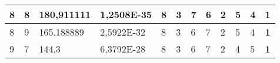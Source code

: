 \documentclass[conference]{IEEEtran}
\begin{document}
\begin{table*}[]
\begin{tabular}{|llll|llllllll|}
\multicolumn{1}{|l|}{8}                                                     & \multicolumn{1}{l|}{8}                                                        & \multicolumn{1}{l|}{180,911111}                                                   & 1,2508E-35                     & \multicolumn{1}{l|}{8}                                                  & \multicolumn{1}{l|}{3}                                                  & \multicolumn{1}{l|}{7}                                                  & \multicolumn{1}{l|}{6}                                                  & \multicolumn{1}{l|}{2}                                                  & \multicolumn{1}{l|}{5}                                                  & \multicolumn{1}{l|}{4}                                                  & \textbf{1}                 \\ \hline
\multicolumn{1}{|l|}{8}                                                     & \multicolumn{1}{l|}{9}                                                        & \multicolumn{1}{l|}{165,188889}                                                   & 2,5922E-32                     & \multicolumn{1}{l|}{8}                                                  & \multicolumn{1}{l|}{3}                                                  & \multicolumn{1}{l|}{6}                                                  & \multicolumn{1}{l|}{7}                                                  & \multicolumn{1}{l|}{2}                                                  & \multicolumn{1}{l|}{5}                                                  & \multicolumn{1}{l|}{4}                                                  & \textbf{1}                 \\ \hline
\multicolumn{1}{|l|}{9}                                                     & \multicolumn{1}{l|}{7}                                                        & \multicolumn{1}{l|}{144,3}                                                        & 6,3792E-28                     & \multicolumn{1}{l|}{8}                                                  & \multicolumn{1}{l|}{3}                                                  & \multicolumn{1}{l|}{6}                                                  & \multicolumn{1}{l|}{7}                                                  & \multicolumn{1}{l|}{2}                                                  & \multicolumn{1}{l|}{4}                                                  & \multicolumn{1}{l|}{5}                                                  & \textbf{1}                 \\ \hline

\end{tabular}
\end{table*}
\end{document}
